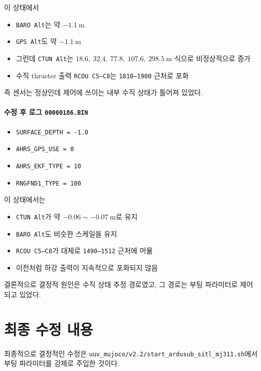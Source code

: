\documentclass[11pt]{article}
\begin{document}
이 상태에서

\begin{itemize}[leftmargin=1.5em]
\item \texttt{BARO Alt}는 약 \(-1.1\ \mathrm{m}\)
\item \texttt{GPS Alt}도 약 \(-1.1\ \mathrm{m}\)
\item 그런데 \texttt{CTUN Alt}는 \(18.6,\ 32.4,\ 77.8,\ 107.6,\ 298.5\ \mathrm{m}\)
      식으로 비정상적으로 증가
\item 수직 thruster 출력 \texttt{RCOU C5--C8}는 \texttt{1810--1900} 근처로 포화
\end{itemize}

즉 센서는 정상인데 제어에 쓰이는 내부 수직 상태가 틀어져 있었다.

\paragraph{수정 후 로그 \texttt{00000186.BIN}}

\begin{itemize}[leftmargin=1.5em]
\item \texttt{SURFACE\_DEPTH = -1.0}
\item \texttt{AHRS\_GPS\_USE = 0}
\item \texttt{AHRS\_EKF\_TYPE = 10}
\item \texttt{RNGFND1\_TYPE = 100}
\end{itemize}

이 상태에서는

\begin{itemize}[leftmargin=1.5em]
\item \texttt{CTUN Alt}가 약 \(-0.06 \sim -0.07\ \mathrm{m}\)로 유지
\item \texttt{BARO Alt}도 비슷한 스케일을 유지
\item \texttt{RCOU C5--C8}가 대체로 \texttt{1490--1512} 근처에 머묾
\item 이전처럼 하강 출력이 지속적으로 포화되지 않음
\end{itemize}

결론적으로 결정적 원인은 수직 상태 추정 경로였고, 그 경로는 부팅 파라미터로
제어되고 있었다.

\section{최종 수정 내용}

최종적으로 결정적인 수정은
\texttt{uuv\_mujoco/v2.2/start\_ardusub\_sitl\_mj311.sh}에서 부팅 파라미터를
강제로 주입한 것이다.
\end{document}
